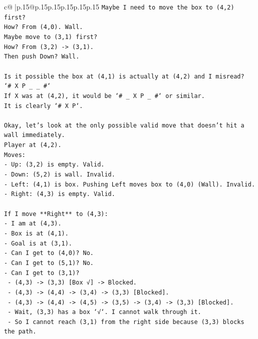 \documentclass{article}
\begin{document}
{\begin{supertabular}{c@{$\;$}|p{.15\linewidth}@{}p{.15\linewidth}p{.15\linewidth}p{.15\linewidth}p{.15\linewidth}p{.15\linewidth}}
{{{\texttt{Maybe I need to move the box to (4,2) first?} \\
\texttt{How? From (4,0). Wall.} \\
\texttt{Maybe move to (3,1) first?} \\
\texttt{How? From (3,2) {-}> (3,1).} \\
\texttt{Then push Down? Wall.} \\
\\ 
\texttt{Is it possible the box at (4,1) is actually at (4,2) and I misread?} \\
\texttt{`\# X P \_ \_ \#`} \\
\texttt{If X was at (4,2), it would be `\# \_ X P \_ \#` or similar.} \\
\texttt{It is clearly `\# X P`.} \\
\\ 
\texttt{Okay, let's look at the only possible valid move that doesn't hit a wall immediately.} \\
\texttt{Player at (4,2).} \\
\texttt{Moves:} \\
\texttt{{-} Up: (3,2) is empty. Valid.} \\
\texttt{{-} Down: (5,2) is wall. Invalid.} \\
\texttt{{-} Left: (4,1) is box. Pushing Left moves box to (4,0) (Wall). Invalid.} \\
\texttt{{-} Right: (4,3) is empty. Valid.} \\
\\ 
\texttt{If I move **Right** to (4,3):} \\
\texttt{{-} I am at (4,3).} \\
\texttt{{-} Box is at (4,1).} \\
\texttt{{-} Goal is at (3,1).} \\
\texttt{{-} Can I get to (4,0)? No.} \\
\texttt{{-} Can I get to (5,1)? No.} \\
\texttt{{-} Can I get to (3,1)?} \\
\texttt{  {-} (4,3) {-}> (3,3) {[}Box √{]} {-}> Blocked.} \\
\texttt{  {-} (4,3) {-}> (4,4) {-}> (3,4) {-}> (3,3) {[}Blocked{]}.} \\
\texttt{  {-} (4,3) {-}> (4,4) {-}> (4,5) {-}> (3,5) {-}> (3,4) {-}> (3,3) {[}Blocked{]}.} \\
\texttt{  {-} Wait, (3,3) has a box `√`. I cannot walk through it.} \\
\texttt{  {-} So I cannot reach (3,1) from the right side because (3,3) blocks the path.} \\
}}}
\end{supertabular}}
\end{document}
